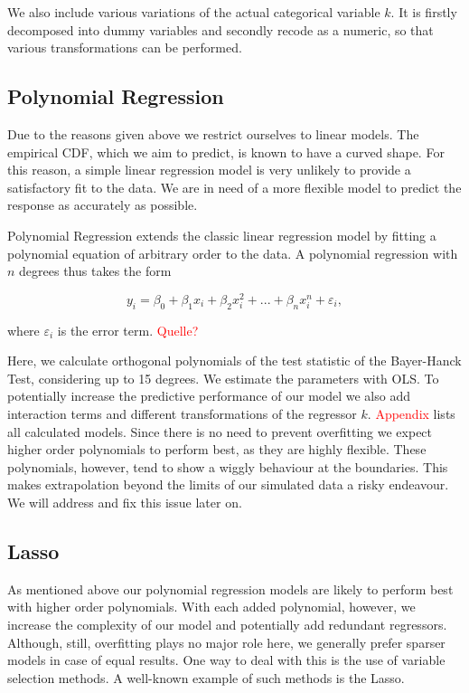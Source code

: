 \documentclass[12pt,a4paper]{article}
\begin{document}
We also include various variations of the actual categorical variable
\(k\). It is firstly decomposed into dummy variables and secondly recode
as a numeric, so that various transformations can be performed.

\hypertarget{polynomial-regression}{%
\subsection{Polynomial Regression}\label{polynomial-regression}}

Due to the reasons given above we restrict ourselves to linear models.
The empirical \ac{CDF}, which we aim to predict, is known to have a
curved shape. For this reason, a simple linear regression model is very
unlikely to provide a satisfactory fit to the data. We are in need of a
more flexible model to predict the response as accurately as possible.

Polynomial Regression extends the classic linear regression model by
fitting a polynomial equation of arbitrary order to the data. A
polynomial regression with \(n\) degrees thus takes the form

\begin{equation}
    y_i = \beta_0 + \beta_1 x_i + \beta_2 x_i^2 + ... + \beta_n x_i^n + \varepsilon_i,
\label{eq:7}
\end{equation}

where \(\varepsilon_i\) is the error term. \textcolor{red}{Quelle?}

Here, we calculate orthogonal polynomials of the test statistic of the
Bayer-Hanck Test, considering up to 15 degrees. We estimate the
parameters with OLS. To potentially increase the predictive performance
of our model we also add interaction terms and different transformations
of the regressor \(k\). \textcolor{red}{Appendix} lists all calculated
models. Since there is no need to prevent overfitting we expect higher
order polynomials to perform best, as they are highly flexible. These
polynomials, however, tend to show a wiggly behaviour at the boundaries.
This makes extrapolation beyond the limits of our simulated data a risky
endeavour. We will address and fix this issue later on.

\hypertarget{section}{%
\subsection{\texorpdfstring{\ac{Lasso}}{}}\label{section}}

As mentioned above our polynomial regression models are likely to
perform best with higher order polynomials. With each added polynomial,
however, we increase the complexity of our model and potentially add
redundant regressors. Although, still, overfitting plays no major role
here, we generally prefer sparser models in case of equal results. One
way to deal with this is the use of variable selection methods. A
well-known example of such methods is the \ac{Lasso}.
\end{document}
